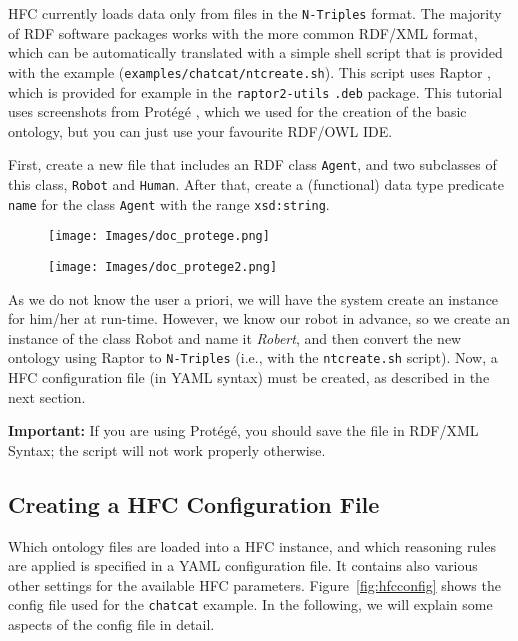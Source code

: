 HFC currently loads data only from files in the \texttt{N-Triples} format. The
majority of RDF software packages works with the more common RDF/XML format,
which can be automatically translated with a simple shell script that is
provided with the example (\texttt{examples/chatcat/ntcreate.sh}). This script
uses Raptor \citep{raptor}, which is provided for example in the
\texttt{raptor2-utils} \texttt{.deb} package. This tutorial uses screenshots
from Protégé \citep{Protege}, which we used for the creation of the basic
ontology, but you can just use your favourite RDF/OWL IDE.

First, create a new file that includes an RDF class \texttt{Agent}, and two
subclasses of this class, \texttt{Robot} and \texttt{Human}. After that, create
a (functional) data type predicate \texttt{name} for the class \texttt{Agent}
with the range \texttt{xsd:string}.

\begin{figure}[htb]
  \center
  \begin{minipage}{0.45\textwidth}
    \centering
    \texttt{[image: Images/doc\_protege.png]}
  \end{minipage}\hfill
  \begin{minipage}{0.45\textwidth}
    \centering
    \texttt{[image: Images/doc\_protege2.png]}
  \end{minipage}
\end{figure}

As we do not know the user a priori, we will have the system create an
instance for him/her at run-time. However, we know our robot in
advance, so we create an instance of the class Robot and name it
\textit{Robert}, and then convert the new ontology using Raptor to
\texttt{N-Triples} (i.e., with the \texttt{ntcreate.sh} script). Now,
a HFC configuration file (in YAML syntax) must be created, as
described in the next section.

\textbf{Important:} If you are using Prot\'eg\'e, you should save the file in
RDF/XML Syntax; the script will not work properly otherwise.

\subsection{Creating a HFC Configuration File}

Which ontology files are loaded into a HFC instance, and which
reasoning rules are applied is specified in a YAML configuration
file. It contains also various other settings for the available HFC
parameters. Figure~\ref{fig:hfcconfig} shows the config file used for
the \texttt{chatcat} example. In the following, we will explain some
aspects of the config file in detail.


